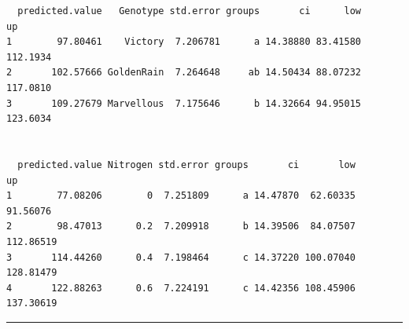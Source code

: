 \documentclass[a4paper, 10pt, fleqn, twosided]{memoir}
\begin{document}
\begin{tcolorbox}[title = Exercise 15 output continued]
\begin{verbatim}
  predicted.value   Genotype std.error groups       ci      low       up
1        97.80461    Victory  7.206781      a 14.38880 83.41580 112.1934
2       102.57666 GoldenRain  7.264648     ab 14.50434 88.07232 117.0810
3       109.27679 Marvellous  7.175646      b 14.32664 94.95015 123.6034


  predicted.value Nitrogen std.error groups       ci       low        up
1        77.08206        0  7.251809      a 14.47870  62.60335  91.56076
2        98.47013      0.2  7.209918      b 14.39506  84.07507 112.86519
3       114.44260      0.4  7.198464      c 14.37220 100.07040 128.81479
4       122.88263      0.6  7.224191      c 14.42356 108.45906 137.30619

\end{verbatim}
{\color{outpt} {\hrule height 1pt}} \vspace{0.2cm}

\end{tcolorbox}
\end{document}
